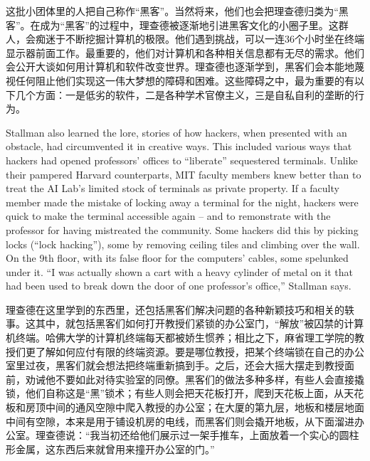\ifdefined\chs
这批小团体里的人把自己称作``黑客''。当然将来，他们也会把理查德归类为``黑客''。在成为``黑客''的过程中，理查德被逐渐地引进黑客文化的小圈子里。这群人，会痴迷于不断挖掘计算机的极限。他们遇到挑战，可以一连36个小时坐在终端显示器前面工作。最重要的，他们对计算机和各种相关信息都有无尽的需求。他们会公开大谈如何用计算机和软件改变世界。理查德也逐渐学到，黑客们会本能地蔑视任何阻止他们实现这一伟大梦想的障碍和困难。这些障碍之中，最为重要的有以下几个方面：一是低劣的软件，二是各种学术官僚主义，三是自私自利的垄断的行为。
\fi

\ifdefined\eng
Stallman also learned the lore, stories of how hackers, when presented with an obstacle, had circumvented it in creative ways. This included various ways that hackers had opened professors' offices to ``liberate'' sequestered terminals. Unlike their pampered Harvard counterparts, MIT faculty members knew better than to treat the AI Lab's limited stock of terminals as private property. If a faculty member made the mistake of locking away a terminal for the night, hackers were quick to make the terminal accessible again -- and to remonstrate with the professor for having mistreated the community.  Some hackers did this by picking locks (``lock hacking''), some by removing ceiling tiles and climbing over the wall.  On the 9th floor, with its false floor for the computers' cables, some spelunked under it.  ``I was actually shown a cart with a heavy cylinder of metal on it that had been used to break down the door of one professor's office,'' Stallman says.
\fi

\ifdefined\chs
理查德在这里学到的东西里，还包括黑客们解决问题的各种新颖技巧和相关的轶事。这其中，就包括黑客们如何打开教授们紧锁的办公室门，``解放''被囚禁的计算机终端。哈佛大学的计算机终端每天都被娇生惯养；相比之下，麻省理工学院的教授们更了解如何应付有限的终端资源。要是哪位教授，把某个终端锁在自己的办公室里过夜，黑客们就会想法把终端重新搞到手。之后，还会大摇大摆走到教授面前，劝诫他不要如此对待实验室的同僚。黑客们的做法多种多样，有些人会直接撬锁，他们自称这是``黑''锁术；有些人则会把天花板打开，爬到天花板上面，从天花板和房顶中间的通风空隙中爬入教授的办公室；在大厦的第九层，地板和楼层地面中间有空隙，本来是用于铺设机房的电线，而黑客们则会撬开地板，从下面溜进办公室。理查德说：``我当初还给他们展示过一架手推车，上面放着一个实心的圆柱形金属，这东西后来就曾用来撞开办公室的门。''
\fi

